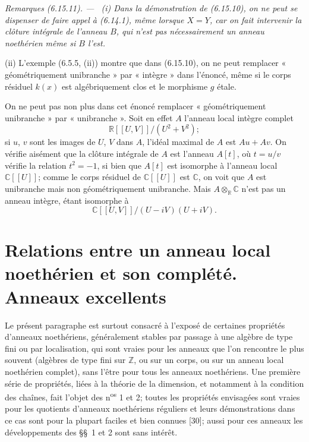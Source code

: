\documentclass[10pt,oneside]{book}
\newcommand{\oldpage}[2][]{%
  \setcounter{footnote}{0}%
  \marginpar{\scriptsize\textbf{#1}~|~#2}\ignorespaces}
\newenvironment{remarks}[1][]{%
  \par\medskip\noindent\itshape Remarques (#1). ---\ }{\par}
\begin{document}
\begin{remarks}[6.15.11]
\label{IV.2.s6.15.11-fr}
(i) Dans la démonstration de (6.15.10), on ne peut se dispenser de faire
appel à (6.14.1), même lorsque $X=Y$, car on fait intervenir la clôture
intégrale de l'anneau $B$, qui n'est pas nécessairement un anneau
noethérien même si $B$ l'est.

(ii) L'exemple (6.5.5, (ii)) montre que dans (6.15.10), on ne peut remplacer
« géométriquement unibranche » par « intègre » dans l'énoncé, même si
le corps résiduel $k(x)$ est algébriquement clos et le morphisme $g$ étale.

\oldpage[IV-2]{182}
On ne peut pas non plus dans cet énoncé remplacer « géométriquement
unibranche » par « unibranche ». Soit en effet $A$ l'anneau local intègre
complet
\[
\mathbb R[[U,V]]/(U^2+V^2);
\]
si $u$, $v$ sont les images de $U$, $V$ dans $A$, l'idéal maximal de $A$
est $Au+Av$. On vérifie aisément que la clôture intégrale de $A$ est
l'anneau $A[t]$, où $t=u/v$ vérifie la relation $t^2=-1$, si bien que
$A[t]$ est isomorphe à l'anneau local $\mathbb C[[U]]$; comme le corps
résiduel de $\mathbb C[[U]]$ est $\mathbb C$, on voit que $A$ est
unibranche mais non géométriquement unibranche. Mais
$A\otimes_{\mathbb R}\mathbb C$ n'est pas un anneau intègre, étant
isomorphe à
\[
\mathbb C[[U,V]]/(U-iV)(U+iV).
\]
\end{remarks}

\section{Relations entre un anneau local noethérien et son complété. Anneaux excellents}
\label{section:IV.7-fr}

Le présent paragraphe est surtout consacré à l'exposé de certaines propriétés
d'anneaux noethériens, généralement stables par passage à une algèbre de type
fini ou par localisation, qui sont vraies pour les anneaux que l'on rencontre
le plus souvent (algèbres de type fini sur $\mathbb Z$, ou sur un corps, ou sur
un anneau local noethérien complet), sans l'être pour tous les anneaux
noethériens. Une première série de propriétés, liées à la théorie de la
dimension, et notamment à la condition des chaînes, fait l'objet des
n\textsuperscript{os} 1 et
2; toutes les propriétés envisagées sont vraies pour les quotients d'anneaux
noethériens réguliers et leurs démonstrations dans ce cas sont pour la plupart
faciles et bien connues [30]; aussi pour ces anneaux les développements des
\S\S~1 et 2 sont sans intérêt.
\end{document}
